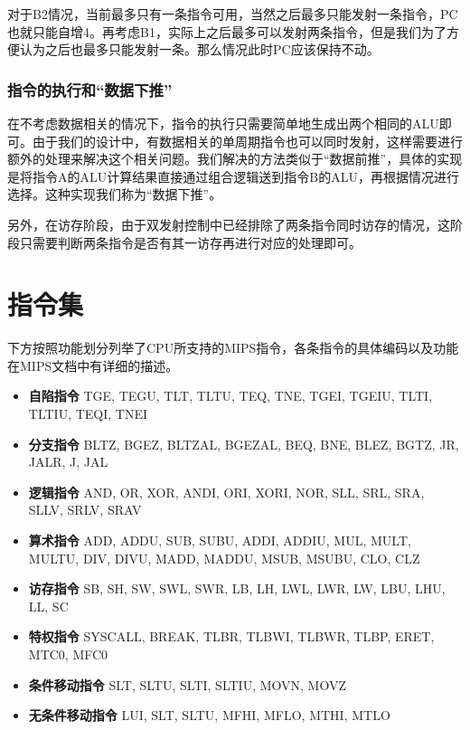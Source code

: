 对于B2情况，当前最多只有一条指令可用，当然之后最多只能发射一条指令，PC也就只能自增4。再考虑B1，实际上之后最多可以发射两条指令，但是我们为了方便认为之后也最多只能发射一条。那么情况此时PC应该保持不动。

\subsubsection{指令的执行和``数据下推''}
在不考虑数据相关的情况下，指令的执行只需要简单地生成出两个相同的ALU即可。由于我们的设计中，有数据相关的单周期指令也可以同时发射，这样需要进行额外的处理来解决这个相关问题。我们解决的方法类似于``数据前推''，具体的实现是将指令A的ALU计算结果直接通过组合逻辑送到指令B的ALU，再根据情况进行选择。这种实现我们称为``数据下推''。

另外，在访存阶段，由于双发射控制中已经排除了两条指令同时访存的情况，这阶段只需要判断两条指令是否有其一访存再进行对应的处理即可。

\begin{landscape}
\begin{figure}[htbp]
	\centering
	\texttt{[image: \{datapath\_crop.pdf]}}
	\caption{CPU数据通路，仅绘制出大致的结构，具体的信号见文字描述。}
	\label{fig:cpu-datapath}
\end{figure}
\end{landscape}
\section{指令集}
下方按照功能划分列举了CPU所支持的MIPS指令，各条指令的具体编码以及功能在MIPS文档中有详细的描述。
\begin{itemize}
	\item \textbf{自陷指令} TGE, TEGU, TLT, TLTU, TEQ, TNE, TGEI, TGEIU, TLTI, TLTIU, TEQI, TNEI
	\item \textbf{分支指令} BLTZ, BGEZ, BLTZAL, BGEZAL, BEQ, BNE, BLEZ, BGTZ, JR, JALR, J, JAL
	\item \textbf{逻辑指令} AND, OR, XOR, ANDI, ORI, XORI, NOR, SLL, SRL, SRA, SLLV, SRLV, SRAV
	\item \textbf{算术指令} ADD, ADDU, SUB, SUBU, ADDI, ADDIU, MUL, MULT, MULTU, DIV, DIVU, MADD, MADDU, MSUB, MSUBU, CLO, CLZ
	\item \textbf{访存指令} SB, SH, SW, SWL, SWR, LB, LH, LWL, LWR, LW, LBU, LHU, LL, SC
	\item \textbf{特权指令} SYSCALL, BREAK, TLBR, TLBWI, TLBWR, TLBP, ERET, MTC0, MFC0
	\item \textbf{条件移动指令} SLT, SLTU, SLTI, SLTIU, MOVN, MOVZ
	\item \textbf{无条件移动指令} LUI, SLT, SLTU, MFHI, MFLO, MTHI, MTLO 
\end{itemize}


